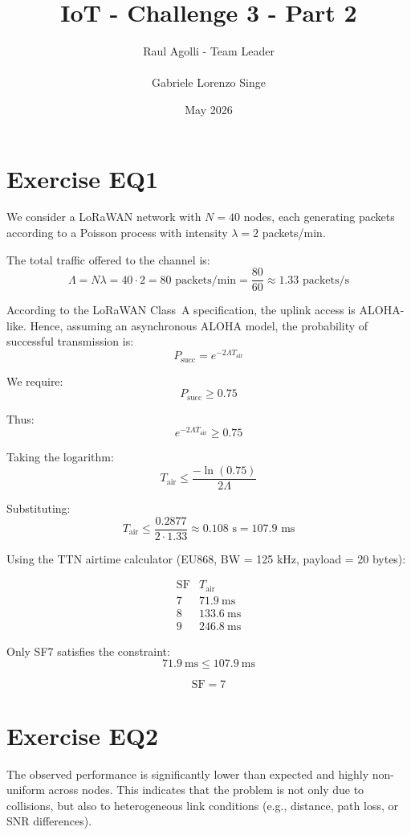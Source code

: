 \documentclass[a4paper,12pt]{article}
\title{IoT - Challenge 3 - Part 2}
\author{Raul Agolli - Team Leader \\\\ Gabriele Lorenzo Singe}
\date{May 2026}
\begin{document}
\maketitle

\section*{Exercise EQ1}

We consider a LoRaWAN network with $N=40$ nodes, each generating packets according to a Poisson process with intensity $\lambda = 2$ packets/min.

The total traffic offered to the channel is:
\[
\Lambda = N \lambda = 40 \cdot 2 = 80 \text{ packets/min} = \frac{80}{60} \approx 1.33 \text{ packets/s}
\]

According to the LoRaWAN Class~A specification, the uplink access is ALOHA-like. Hence, assuming an asynchronous ALOHA model, the probability of successful transmission is:
\[
P_{\text{succ}} = e^{-2\Lambda T_{\text{air}}}
\]

We require:
\[
P_{\text{succ}} \ge 0.75
\]

Thus:
\[
e^{-2\Lambda T_{\text{air}}} \ge 0.75
\]

Taking the logarithm:
\[
T_{\text{air}} \le \frac{-\ln(0.75)}{2\Lambda}
\]

Substituting:
\[
T_{\text{air}} \le \frac{0.2877}{2 \cdot 1.33} \approx 0.108 \text{ s} = 107.9 \text{ ms}
\]

Using the TTN airtime calculator (EU868, BW = 125 kHz, payload = 20 bytes):

\[
\begin{array}{c|c}
\text{SF} & T_{\text{air}} \\
\hline
7 & 71.9\ \text{ms} \\
8 & 133.6\ \text{ms} \\
9 & 246.8\ \text{ms}
\end{array}
\]

Only SF7 satisfies the constraint:
\[
71.9\ \text{ms} \le 107.9\ \text{ms}
\]

\[
\boxed{\text{SF} = 7}
\]

\section*{Exercise EQ2}

The observed performance is significantly lower than expected and highly non-uniform across nodes. This indicates that the problem is not only due to collisions, but also to heterogeneous link conditions (e.g., distance, path loss, or SNR differences).
\end{document}
